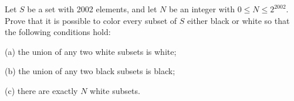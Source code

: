 Let $S$ be a set with 2002 elements, and let $N$ be an integer with $0 \leq N \leq 2^{2002}$. Prove that it is possible to color every subset of $S$ either black or white so that the following conditions hold:

(a) the union of any two white subsets is white;

(b) the union of any two black subsets is black;

(c) there are exactly $N$ white subsets.